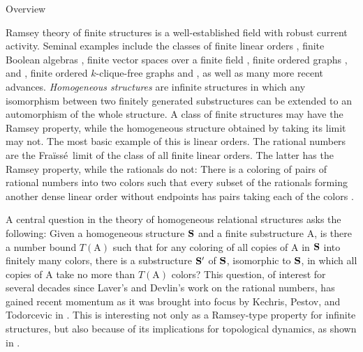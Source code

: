 \documentclass{amsart}
\theoremstyle{remark}
\theoremstyle{definition}
\theoremstyle{remark}
\newcommand{\POC}{Parallel $1$'s Criterion}
\newcommand{\Fraisse}{Fra{\"{i}}ss{\'{e}}}
\begin{document}






\begin{center}
{\sc Overview}
\end{center}


 Ramsey theory  of finite structures is a well-established field with robust current activity.
Seminal examples include the classes of  finite linear orders \cite{Ramsey30},
finite Boolean algebras \cite{Graham/Rothschild71},
finite vector spaces over a finite field \cite{Graham/Leeb/Rothschild72},
finite ordered graphs \cite{Abramson/Harringon78}, \cite{Nesetril/Rodl77} and \cite{Nesetril/Rodl83},
finite ordered $k$-clique-free graphs  \cite{Nesetril/Rodl77} and \cite{Nesetril/Rodl83}, as well as many more recent advances.
{\em Homogeneous structures} are infinite structures  in which  any isomorphism between two finitely generated substructures can be extended to an automorphism of the whole structure.
A class of finite structures may have the Ramsey property, while the  homogeneous structure obtained by taking its limit may not.
The most basic example of this is linear orders.
The rational numbers are the \Fraisse\ limit of the class of all finite linear orders.
The latter has the Ramsey property, while the rationals do not:
There is a coloring of pairs of rational numbers into two colors such that every subset of the rationals forming another dense linear order without endpoints
has pairs taking each of the colors \cite{DevlinThesis}.




A  central question in the theory of  homogeneous relational structures asks the following:
Given a homogeneous structure $\bf{S}$ and
a finite substructure $\mathrm{A}$,
is there a number bound $T(\mathrm{A})$ such that for any coloring of all copies of $\mathrm{A}$ in $\bf{S}$ into finitely many colors,
there is a substructure $\bf{S}'$ of $\bf{S}$, isomorphic to  $\bf{S}$,
in which all copies of $\mathrm{A}$  take no more than $T(\mathrm{A})$ colors?
This question,  of interest for several decades since Laver's and Devlin's work on the rational numbers,  has gained recent momentum as it was
 brought into focus
 by Kechris, Pestov, and Todorcevic in \cite{Kechris/Pestov/Todorcevic05}.
This is interesting not only as a Ramsey-type property for infinite structures, but also because of its implications for topological dynamics, as shown in \cite{Zucker17}.
\end{document}
